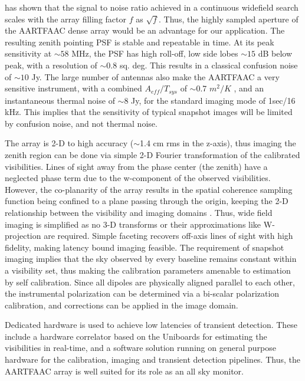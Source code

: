 \documentclass{aa}
\begin{document}
\citet{backer1999pers} has  shown that the signal  to noise ratio  achieved in a
continuous  widefield  search  scales  with  the array  filling  factor  $f$  as
$\sqrt{f}$. Thus, the highly sampled  aperture of the AARTFAAC dense array would
be an advantage for our application. The resulting zenith pointing PSF is stable
and repeatable in  time. At its peak sensitivity at $\sim$$58$  MHz, the PSF has
high roll-off,  low side lobes  $\sim$$15$ dB below  peak, with a  resolution of
$\sim$$0.8$ sq.  deg.  This results in a classical confusion noise of $\sim$$10$
Jy.   The large  number of  antennas  also make  the AARTFAAC  a very  sensitive
instrument,   with   a  combined   $A_{eff}/T_{sys}$   of  $\sim$0.7   $m^{2}/K$
\citep{wijnholds2011situ}, and an instantaneous thermal noise of $\sim$8 Jy, for
the standard imaging mode of 1sec/16  kHz.  This implies that the sensitivity of
typical  snapshot images will  be limited  by confusion  noise, and  not thermal
noise.

The array is 2-D to high accuracy ($\sim$1.4 cm rms in the z-axis), thus imaging
the zenith  region can be done  via simple \mbox{2-D}  Fourier transformation of
the calibrated  visibilities.  Lines  of sight away  from the phase  center (the
zenith)  have a  neglected phase  term due  to the  w-component of  the observed
visibilities.  However,  the co-planarity  of the array  results in  the spatial
coherence  sampling function  being  confined  to a  plane  passing through  the
origin, keeping the 2-D relationship  between the visibility and imaging domains
\citep{cornwell1992radio}.   Thus, wide field  imaging is  simplified as  no 3-D
transforms  or  their approximations  like  W-projection  are required.   Simple
faceting recovers  off-axis lines  of sight with  high fidelity,  making latency
bound imaging feasible. The requirement of snapshot imaging implies that the sky
observed by every baseline remains constant within a visibility set, thus making
the calibration  parameters amenable to  estimation by self  calibration.  Since
all  dipoles are  physically aligned  parallel to  each other,  the instrumental
polarization  can be determined  via a  bi-scalar polarization  calibration, and
corrections can be applied in the image domain.

Dedicated  hardware is  used to  achieve low  latencies of  transient detection.
These include  a hardware correlator based  on the Uniboards  for estimating the
visibilities in  real-time, and a  software solution running on  general purpose
hardware for  the calibration, imaging and transient  detection pipelines. Thus,
the AARTFAAC array is well suited for its role as an all sky monitor.
\end{document}
